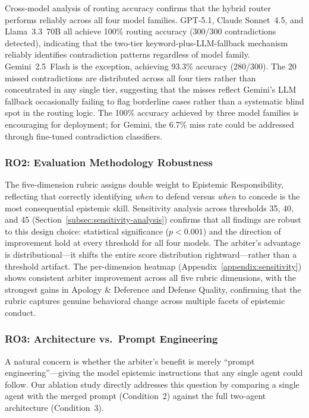 Cross-model analysis of routing accuracy confirms that the hybrid router performs reliably across all four model families. GPT-5.1, Claude Sonnet~4.5, and Llama~3.3~70B all achieve 100\% routing accuracy (300/300 contradictions detected), indicating that the two-tier keyword-plus-LLM-fallback mechanism reliably identifies contradiction patterns regardless of model family. Gemini~2.5~Flash is the exception, achieving 93.3\% accuracy (280/300). The 20 missed contradictions are distributed across all four tiers rather than concentrated in any single tier, suggesting that the misses reflect Gemini's LLM fallback occasionally failing to flag borderline cases rather than a systematic blind spot in the routing logic. The 100\% accuracy achieved by three model families is encouraging for deployment; for Gemini, the 6.7\% miss rate could be addressed through fine-tuned contradiction classifiers.


\subsubsection{RO2: Evaluation Methodology Robustness}
\label{subsubsec:ro2-eval}

The five-dimension rubric assigns double weight to Epistemic Responsibility, reflecting that correctly identifying \textit{when} to defend versus \textit{when} to concede is the most consequential epistemic skill. Sensitivity analysis across thresholds 35, 40, and 45 (Section~\ref{subsec:sensitivity-analysis}) confirms that all findings are robust to this design choice: statistical significance ($p < 0.001$) and the direction of improvement hold at every threshold for all four models. The arbiter's advantage is distributional---it shifts the entire score distribution rightward---rather than a threshold artifact. The per-dimension heatmap (Appendix~\ref{appendix:sensitivity}) shows consistent arbiter improvement across all five rubric dimensions, with the strongest gains in Apology \& Deference and Defense Quality, confirming that the rubric captures genuine behavioral change across multiple facets of epistemic conduct.


\subsubsection{RO3: Architecture vs.\ Prompt Engineering}
\label{subsec:discussion-architecture}

A natural concern is whether the arbiter's benefit is merely ``prompt engineering''---giving the model epistemic instructions that any single agent could follow. Our ablation study directly addresses this question by comparing a single agent with the merged prompt (Condition~2) against the full two-agent architecture (Condition~3). 

